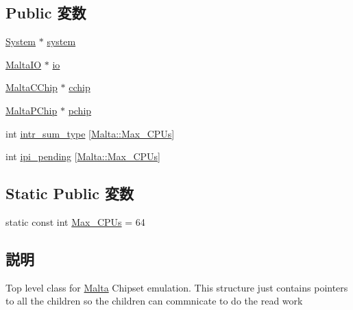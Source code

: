 \subsection*{Public 変数}
\begin{DoxyCompactItemize}
\item 
\hyperlink{classSystem}{System} $\ast$ \hyperlink{classMalta_af27ccd765f13a4b7bd119dc7579e2746}{system}
\item 
\hyperlink{classMalta_1_1MaltaIO}{MaltaIO} $\ast$ \hyperlink{classMalta_aecab915d0de4a8ce102b5d7904f9cb13}{io}
\item 
\hyperlink{classMalta_1_1MaltaCChip}{MaltaCChip} $\ast$ \hyperlink{classMalta_a5d34b1cefc8f42c4e48ca7132a5ff9ce}{cchip}
\item 
\hyperlink{classMalta_1_1MaltaPChip}{MaltaPChip} $\ast$ \hyperlink{classMalta_ac4b4664e7d3bda2f7f4af6fdfc5e246c}{pchip}
\item 
int \hyperlink{classMalta_a8b0ff0114edf7682d27853102d207c45}{intr\_\-sum\_\-type} \mbox{[}\hyperlink{classMalta_ab15ce4af0fe2c47746a30bafa34ced51}{Malta::Max\_\-CPUs}\mbox{]}
\item 
int \hyperlink{classMalta_abe53041a06886c8b2519264101cabfa5}{ipi\_\-pending} \mbox{[}\hyperlink{classMalta_ab15ce4af0fe2c47746a30bafa34ced51}{Malta::Max\_\-CPUs}\mbox{]}
\end{DoxyCompactItemize}
\subsection*{Static Public 変数}
\begin{DoxyCompactItemize}
\item 
static const int \hyperlink{classMalta_ab15ce4af0fe2c47746a30bafa34ced51}{Max\_\-CPUs} = 64
\end{DoxyCompactItemize}


\subsection{説明}
Top level class for \hyperlink{classMalta}{Malta} Chipset emulation. This structure just contains pointers to all the children so the children can commnicate to do the read work 

